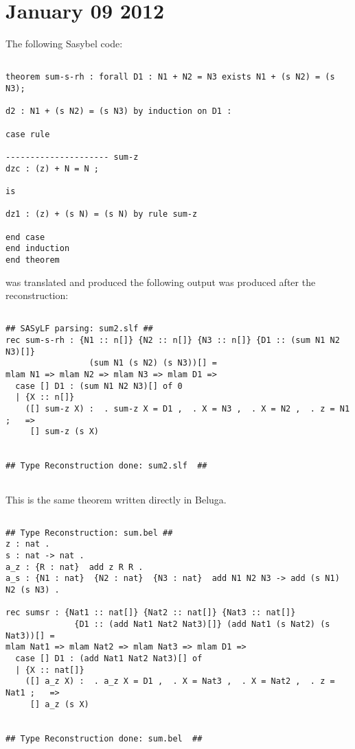 \documentclass[12pt]{article}
\begin{document}
\section{January 09 2012}
The following \textmd{Sasybel} code:
\begin{verbatim}

theorem sum-s-rh : forall D1 : N1 + N2 = N3 exists N1 + (s N2) = (s N3);

d2 : N1 + (s N2) = (s N3) by induction on D1 :

case rule

--------------------- sum-z
dzc : (z) + N = N ;

is

dz1 : (z) + (s N) = (s N) by rule sum-z

end case
end induction
end theorem

\end{verbatim}
was translated and produced the following output was produced after the reconstruction:
\begin{verbatim}

## SASyLF parsing: sum2.slf ##
rec sum-s-rh : {N1 :: n[]} {N2 :: n[]} {N3 :: n[]} {D1 :: (sum N1 N2 N3)[]}
                 (sum N1 (s N2) (s N3))[] =
mlam N1 => mlam N2 => mlam N3 => mlam D1 =>
  case [] D1 : (sum N1 N2 N3)[] of 0
  | {X :: n[]}
    ([] sum-z X) :  . sum-z X = D1 ,  . X = N3 ,  . X = N2 ,  . z = N1 ;   =>
     [] sum-z (s X)


## Type Reconstruction done: sum2.slf  ##


\end{verbatim}
This is the same theorem written directly in \textmd{Beluga}.
\begin{verbatim}

## Type Reconstruction: sum.bel ##
z : nat .
s : nat -> nat .
a_z : {R : nat}  add z R R .
a_s : {N1 : nat}  {N2 : nat}  {N3 : nat}  add N1 N2 N3 -> add (s N1) N2 (s N3) .

rec sumsr : {Nat1 :: nat[]} {Nat2 :: nat[]} {Nat3 :: nat[]}
              {D1 :: (add Nat1 Nat2 Nat3)[]} (add Nat1 (s Nat2) (s Nat3))[] =
mlam Nat1 => mlam Nat2 => mlam Nat3 => mlam D1 =>
  case [] D1 : (add Nat1 Nat2 Nat3)[] of
  | {X :: nat[]}
    ([] a_z X) :  . a_z X = D1 ,  . X = Nat3 ,  . X = Nat2 ,  . z = Nat1 ;   =>
     [] a_z (s X)


## Type Reconstruction done: sum.bel  ##

\end{verbatim}
\end{document}
